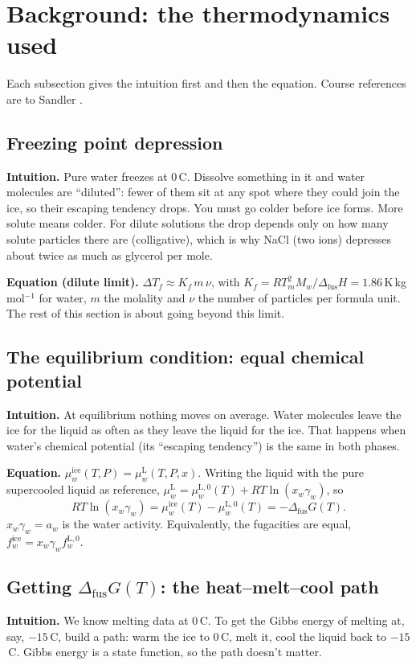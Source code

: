 \documentclass[11pt,a4paper]{article}
\newcommand{\dfus}{\Delta_{\mathrm{fus}}}
\begin{document}
\section{Background: the thermodynamics used}

Each subsection gives the intuition first and then the equation. Course references are to Sandler \cite{sandler}.

\subsection{Freezing point depression}
\textbf{Intuition.} Pure water freezes at 0\,\textdegree C. Dissolve something in it and water molecules are
``diluted'': fewer of them sit at any spot where they could join the ice, so their escaping tendency drops. You
must go colder before ice forms. More solute means colder. For dilute solutions the drop depends only on how many
solute particles there are (colligative), which is why NaCl (two ions) depresses about twice as much as glycerol per
mole.

\textbf{Equation (dilute limit).} $\Delta T_f \approx K_f\,m\,\nu$, with $K_f = RT_m^2M_w/\dfus H = 1.86$\,K\,kg\,mol$^{-1}$
for water, $m$ the molality and $\nu$ the number of particles per formula unit. The rest of this section is about
going beyond this limit.

\subsection{The equilibrium condition: equal chemical potential}
\textbf{Intuition.} At equilibrium nothing moves on average. Water molecules leave the ice for the liquid as often as
they leave the liquid for the ice. That happens when water's chemical potential (its ``escaping tendency'') is the
same in both phases.

\textbf{Equation.} $\mu_w^{\mathrm{ice}}(T,P)=\mu_w^{\mathrm{L}}(T,P,x)$. Writing the liquid with the pure
supercooled liquid as reference, $\mu_w^{\mathrm{L}}=\mu_w^{\mathrm{L},0}(T)+RT\ln(x_w\gamma_w)$, so
\begin{equation}
RT\ln(x_w\gamma_w) = \mu_w^{\mathrm{ice}}(T)-\mu_w^{\mathrm{L},0}(T) = -\dfus G(T).
\end{equation}
$x_w\gamma_w=a_w$ is the water activity. Equivalently, the fugacities are equal, $f_w^{\mathrm{ice}}=x_w\gamma_wf_w^{\mathrm{L},0}$.

\subsection{Getting $\dfus G(T)$: the heat--melt--cool path}
\textbf{Intuition.} We know melting data at 0\,\textdegree C. To get the Gibbs energy of melting at, say,
$-15$\,\textdegree C, build a path: warm the ice to 0\,\textdegree C, melt it, cool the liquid back to
$-15$\,\textdegree C. Gibbs energy is a state function, so the path doesn't matter.
\end{document}
